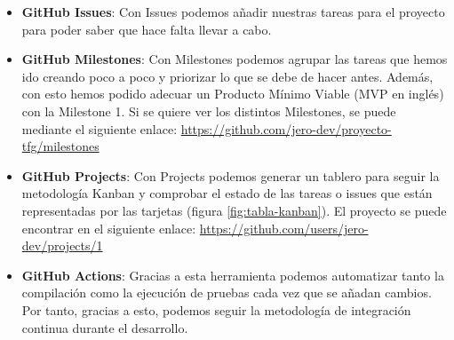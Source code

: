 \begin{itemize}
    \item \textbf{GitHub Issues}: Con Issues podemos añadir nuestras tareas para el 
    proyecto para poder saber que hace falta llevar a cabo.
    \item \textbf{GitHub Milestones}: Con Milestones podemos agrupar las tareas que 
    hemos ido creando poco a poco y priorizar lo que se debe de hacer antes. 
    Además, con esto hemos podido adecuar un Producto Mínimo Viable (MVP en inglés) 
    con la Milestone 1. Si se quiere ver los distintos Milestones, se puede 
    mediante el siguiente enlace: 
    \url{https://github.com/jero-dev/proyecto-tfg/milestones}
    \item \textbf{GitHub Projects}: Con Projects podemos generar un tablero para 
    seguir la metodología Kanban y comprobar el estado de las tareas o issues que 
    están representadas por las tarjetas (figura \ref{fig:tabla-kanban}). El 
    proyecto se puede encontrar en el siguiente enlace: 
    \url{https://github.com/users/jero-dev/projects/1}
    \item \textbf{GitHub Actions}: Gracias a esta herramienta podemos automatizar 
    tanto la compilación como la ejecución de pruebas cada vez que se añadan 
    cambios. Por tanto, gracias a esto, podemos seguir la metodología de 
    integración continua durante el desarrollo.
\end{itemize}
